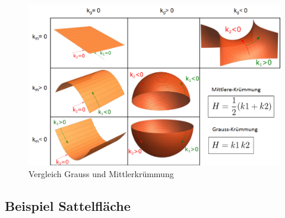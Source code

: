 \begin{refsection}
\begin{figure} 
  \centering
  \includegraphics[scale=0.4]{minimal/Tabelle_Kruemmung.png}
  \caption{Vergleich Grauss und Mittlerkrümmung} 
\end{figure}



\subsection{Beispiel Sattelfläche}

\end{refsection}
